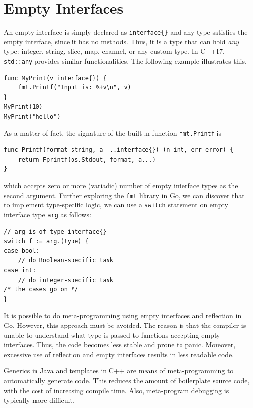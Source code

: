 \documentclass[11pt]{article}
\begin{document}
\section*{Empty Interfaces}
\label{sec:orgheadline10}
An empty interface is simply declared as \texttt{interface\{\}} and any type satisfies the empty interface, since it has no methods. Thus, it is a type that can hold \emph{any} type: integer, string, slice, map, channel, or any custom type. In C++17, \texttt{std::any} provides similar functionalities. The following example illustrates this.
\begin{verbatim}
func MyPrint(v interface{}) {
	fmt.Printf("Input is: %+v\n", v)
}
MyPrint(10)
MyPrint("hello")
\end{verbatim}
As a matter of fact, the signature of the built-in function \texttt{fmt.Printf} is
\begin{verbatim}
func Printf(format string, a ...interface{}) (n int, err error) {
	return Fprintf(os.Stdout, format, a...)
}
\end{verbatim}
which accepts zero or more (variadic) number of empty interface types as the second argument. Further exploring the \texttt{fmt} library in Go, we can discover that to implement type-specific logic, we can use a \texttt{switch} statement on empty interface type \texttt{arg} as follows:
\begin{verbatim}
// arg is of type interface{}
switch f := arg.(type) {
case bool:
	// do Boolean-specific task
case int:
	// do integer-specific task
/* the cases go on */
}
\end{verbatim}

It is possible to do meta-programming using empty interfaces and reflection in Go. However, this approach must be avoided. The reason is that the compiler is unable to understand what type is passed to functions accepting empty interfaces. Thus, the code becomes less stable and prone to panic. Moreover, excessive use of reflection and empty interfaces results in less readable code.

Generics in Java and templates in C++ are means of meta-programming to automatically generate code. This reduces the amount of boilerplate source code, with the cost of increasing compile time. Also, meta-program debugging is typically more difficult.
\end{document}

